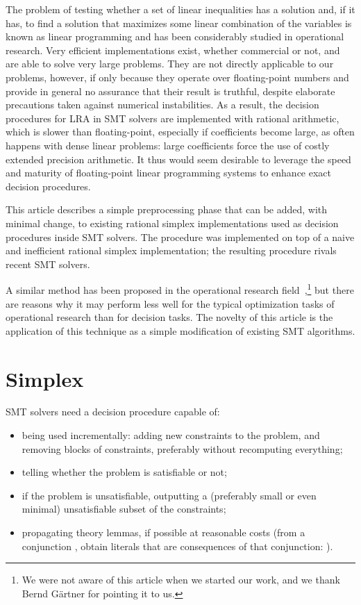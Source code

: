 The problem of testing whether a set of linear inequalities has a solution and, if it has, to find a solution that maximizes some linear combination of the variables is known as linear programming and has been considerably studied in operational research. Very efficient implementations exist, whether commercial or not, and are able to solve very large problems. They are not directly applicable to our problems, however, if only because they operate over floating-point numbers and provide in general no assurance that their result is truthful, despite elaborate precautions taken against numerical instabilities. As a result, the decision procedures for LRA in SMT solvers are implemented with rational arithmetic, which is slower than floating-point, especially if coefficients become large, as often happens with dense linear problems: large coefficients force the use of costly extended precision arithmetic. It thus would seem desirable to leverage the speed and maturity of floating-point linear programming systems to enhance exact decision procedures.

This article describes a simple preprocessing phase that can be added, with minimal change, to existing rational simplex implementations used as decision procedures inside SMT solvers. The procedure was implemented on top of a naive and inefficient rational simplex implementation; the resulting procedure rivals recent SMT solvers.

A similar method has been proposed in the operational research field~\cite{Dihflaoui_et_al_SODA03},\footnote{We were not aware of this article when we started our work, and we thank Bernd G\"{a}rtner for pointing it to us.}
but there are reasons why it may perform less well for the typical optimization tasks of operational research than for decision tasks. The novelty of this article is the application of this technique as a simple modification of existing SMT algorithms.

\section{Simplex}
SMT solvers need a decision procedure capable of:
\begin{itemize}
\item being used incrementally: adding new constraints to the problem, and removing blocks of constraints, preferably without recomputing everything;
\item telling whether the problem is satisfiable or not;
\item if the problem is unsatisfiable, outputting a (preferably small or even minimal) unsatisfiable subset of the constraints;
\item propagating theory lemmas, if possible at reasonable costs (from a conjunction , obtain literals  that are consequences of that conjunction: ).
\end{itemize}

